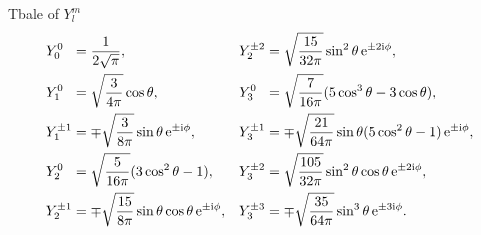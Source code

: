 \documentclass{article}
\newcommand{\su}[1]{\vspace{-#1 pt}}
\begin{document}
\begin{example}{Tbale of $Y_l^m$}{}
	\su{12}
	\begin{align*}
		Y_0^0~\;    & =\frac1{2\sqrt\pi},                                           & Y_2^{\pm 2} & =\sqrt{\frac{15}{32\pi}}\sin^2\theta \mathop{}\!\mathrm{e}^{\pm 2\mathrm{i}\phi},                 \\
		Y_1^0~\;    & =\sqrt{\frac3{4\pi}}\cos\theta,                               & Y_3^0~\;    & =\sqrt{\frac7{16\pi}}(5\cos^3\theta-3\cos\theta),                    \\
		Y_1^{\pm 1} & =\mp\sqrt{\frac3{8\pi}}\sin\theta \mathop{}\!\mathrm{e}^{\pm \mathrm{i}\phi},              & Y_3^{\pm 1} & =\mp\sqrt{\frac{21}{64\pi}}\sin\theta(5\cos^2\theta-1)\mathop{}\!\mathrm{e}^{\pm \mathrm{i}\phi}, \\
		Y_2^0~\;    & =\sqrt{\frac5{16\pi}}(3\cos^2\theta-1),                       & Y_3^{\pm 2} & =\sqrt{\frac{105}{32\pi}}\sin^2\theta\cos\theta \mathop{}\!\mathrm{e}^{\pm 2\mathrm{i}\phi},      \\
		Y_2^{\pm 1} & =\mp\sqrt{\frac{15}{8\pi}}\sin\theta\cos\theta \mathop{}\!\mathrm{e}^{\pm \mathrm{i}\phi}, & Y_3^{\pm 3} & =\mp\sqrt{\frac{35}{64\pi}}\sin^3\theta \mathop{}\!\mathrm{e}^{\pm 3\mathrm{i}\phi}.
	\end{align*}
\end{example}
\newpage
\end{document}
